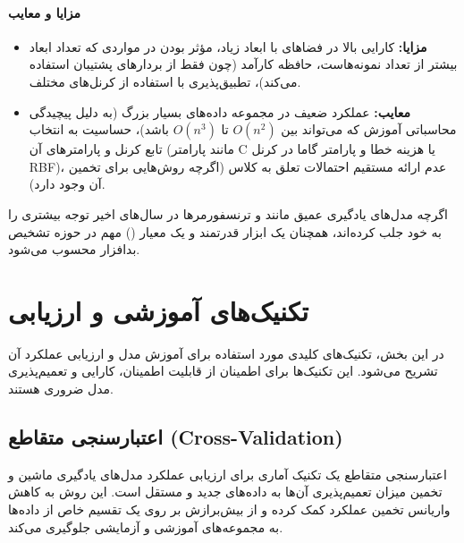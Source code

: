 \paragraph{مزایا و معایب}
\begin{itemize}
    \item \textbf{مزایا:} کارایی بالا در فضاهای با ابعاد زیاد، مؤثر بودن در مواردی که تعداد ابعاد بیشتر از تعداد نمونه‌هاست، حافظه کارآمد (چون فقط از بردارهای پشتیبان استفاده می‌کند)، تطبیق‌پذیری با استفاده از کرنل‌های مختلف.
    \item \textbf{معایب:} عملکرد ضعیف در مجموعه داده‌های بسیار بزرگ (به دلیل پیچیدگی محاسباتی آموزش که می‌تواند بین \(O(n^2)\) تا \(O(n^3)\) باشد)، حساسیت به انتخاب تابع کرنل و پارامترهای آن (مانند پارامتر C یا هزینه خطا و پارامتر گاما در کرنل RBF)، عدم ارائه مستقیم احتمالات تعلق به کلاس (اگرچه روش‌هایی برای تخمین آن وجود دارد).
\end{itemize}
اگرچه مدل‌های یادگیری عمیق مانند  و ترنسفورمرها در سال‌های اخیر توجه بیشتری را به خود جلب کرده‌اند،  همچنان یک ابزار قدرتمند و یک معیار () مهم در حوزه تشخیص بدافزار محسوب می‌شود.

\section{تکنیک‌های آموزشی و ارزیابی}
در این بخش، تکنیک‌های کلیدی مورد استفاده برای آموزش مدل  و ارزیابی عملکرد آن تشریح می‌شود. این تکنیک‌ها برای اطمینان از قابلیت اطمینان، کارایی و تعمیم‌پذیری مدل ضروری هستند.

\subsection{اعتبارسنجی متقاطع (Cross-Validation)}
اعتبارسنجی متقاطع  یک تکنیک آماری برای ارزیابی عملکرد مدل‌های یادگیری ماشین و تخمین میزان تعمیم‌پذیری آن‌ها به داده‌های جدید و مستقل است. این روش به کاهش واریانس تخمین عملکرد کمک کرده و از بیش‌برازش  بر روی یک تقسیم خاص از داده‌ها به مجموعه‌های آموزشی و آزمایشی جلوگیری می‌کند.

